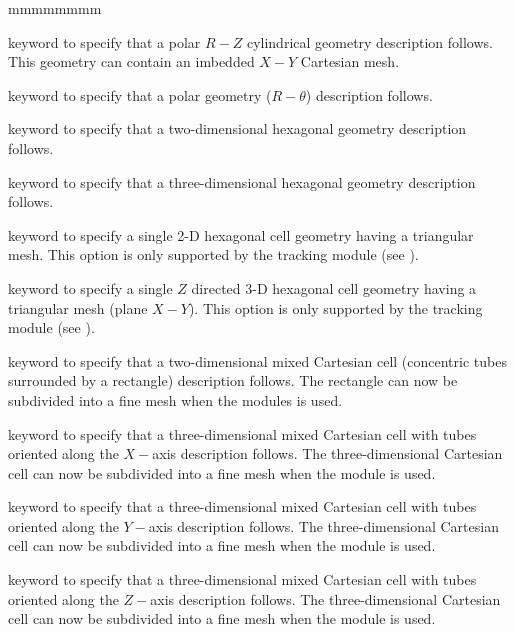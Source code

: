 \begin{ListeDeDescription}{mmmmmmmm}
\item[\moc{TUBEZ}] keyword to specify that a polar $R-Z$ cylindrical geometry
description follows. This geometry can contain an imbedded $X-Y$ Cartesian mesh.

\item[\moc{RTHETA}] keyword to specify that a polar geometry ($R-\theta$)
description follows.

\item[\moc{HEX}] keyword to specify that a two-dimensional hexagonal geometry
description follows.

\item[\moc{HEXZ}] keyword to specify that a three-dimensional hexagonal
geometry description follows.

\item[\moc{HEXT}] keyword to specify a single 2-D hexagonal cell geometry having a triangular mesh. This option is only supported by the  tracking module (see ).

\item[\moc{HEXTZ}] keyword to specify a single $Z$ directed 3-D hexagonal cell geometry having a triangular mesh (plane $X-Y$). This option is only supported by the  tracking module (see ).

\item[\moc{CARCEL}] keyword to specify that a two-dimensional mixed Cartesian
cell (concentric tubes surrounded by a rectangle) description follows. The rectangle can now be
subdivided into a fine mesh when the  modules is used.

\item[\moc{CARCELX}] keyword to specify that a three-dimensional mixed
Cartesian cell with tubes oriented along the $X-$axis description follows. The three-dimensional 
Cartesian cell can now be subdivided into a fine mesh when the 
module is used.

\item[\moc{CARCELY}] keyword to specify that a three-dimensional mixed
Cartesian cell with tubes oriented along the $Y-$axis description follows. The three-dimensional 
Cartesian cell can now be subdivided into a fine mesh when the 
module is used.

\item[\moc{CARCELZ}] keyword to specify that a three-dimensional mixed
Cartesian cell with tubes oriented along the $Z-$axis description follows. The three-dimensional 
Cartesian cell can now be subdivided into a fine mesh when the 
module is used.


\end{ListeDeDescription}
